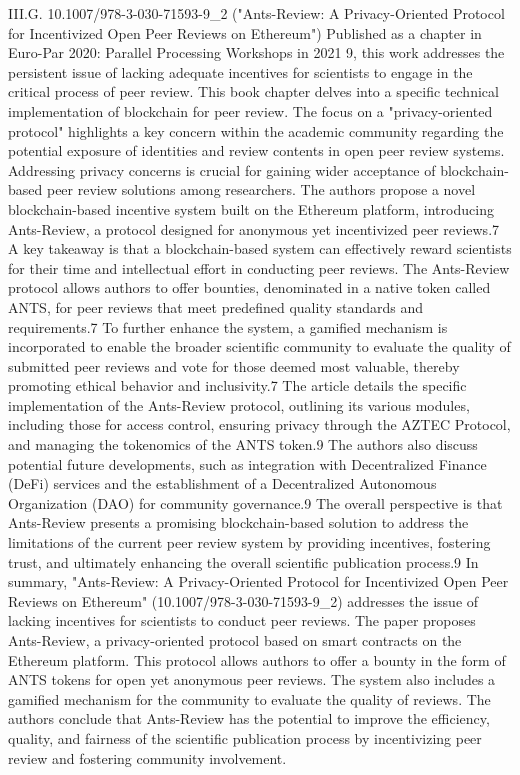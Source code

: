 \documentclass{article}
\begin{document}
III.G. 10.1007/978-3-030-71593-9_2 ("Ants-Review: A Privacy-Oriented Protocol for Incentivized Open Peer Reviews on Ethereum")
Published as a chapter in Euro-Par 2020: Parallel Processing Workshops in 2021 9, this work addresses the persistent issue of lacking adequate incentives for scientists to engage in the critical process of peer review. This book chapter delves into a specific technical implementation of blockchain for peer review. The focus on a "privacy-oriented protocol" highlights a key concern within the academic community regarding the potential exposure of identities and review contents in open peer review systems. Addressing privacy concerns is crucial for gaining wider acceptance of blockchain-based peer review solutions among researchers. The authors propose a novel blockchain-based incentive system built on the Ethereum platform, introducing Ants-Review, a protocol designed for anonymous yet incentivized peer reviews.7 A key takeaway is that a blockchain-based system can effectively reward scientists for their time and intellectual effort in conducting peer reviews. The Ants-Review protocol allows authors to offer bounties, denominated in a native token called ANTS, for peer reviews that meet predefined quality standards and requirements.7 To further enhance the system, a gamified mechanism is incorporated to enable the broader scientific community to evaluate the quality of submitted peer reviews and vote for those deemed most valuable, thereby promoting ethical behavior and inclusivity.7 The article details the specific implementation of the Ants-Review protocol, outlining its various modules, including those for access control, ensuring privacy through the AZTEC Protocol, and managing the tokenomics of the ANTS token.9 The authors also discuss potential future developments, such as integration with Decentralized Finance (DeFi) services and the establishment of a Decentralized Autonomous Organization (DAO) for community governance.9 The overall perspective is that Ants-Review presents a promising blockchain-based solution to address the limitations of the current peer review system by providing incentives, fostering trust, and ultimately enhancing the overall scientific publication process.9
In summary, "Ants-Review: A Privacy-Oriented Protocol for Incentivized Open Peer Reviews on Ethereum" (10.1007/978-3-030-71593-9_2) addresses the issue of lacking incentives for scientists to conduct peer reviews. The paper proposes Ants-Review, a privacy-oriented protocol based on smart contracts on the Ethereum platform. This protocol allows authors to offer a bounty in the form of ANTS tokens for open yet anonymous peer reviews. The system also includes a gamified mechanism for the community to evaluate the quality of reviews. The authors conclude that Ants-Review has the potential to improve the efficiency, quality, and fairness of the scientific publication process by incentivizing peer review and fostering community involvement.
\end{document}

